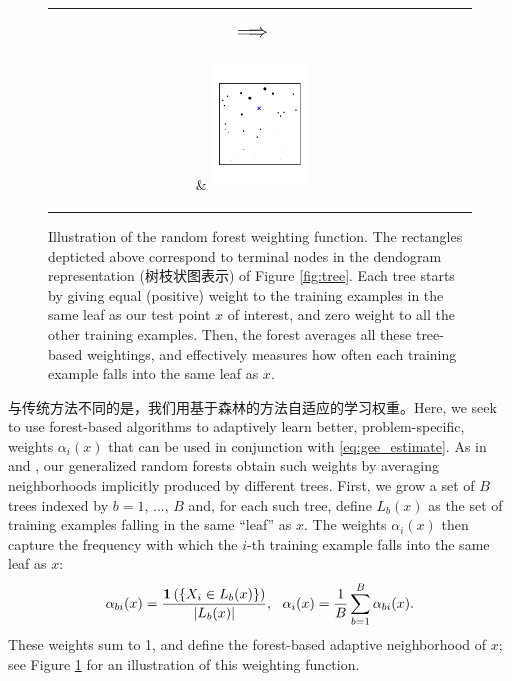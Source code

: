 \documentclass[aos]{imsart}
\theoremstyle{plain}
\theoremstyle{definition}
\theoremstyle{remark}
\begin{document}
\begin{CJK}{UTF8}{gbsn}
\begin{figure}
\begin{center}
\begin{tabular}{cc}
\parbox[b][0.25\textwidth][c]{0.12\textwidth}{$$\mathlarger{\mathlarger{\Longrightarrow}}$$} &
\includegraphics[width = 0.25\textwidth, trim=15mm 40mm 20mm 40mm, clip = TRUE]{tree_match_ensemble.pdf}
\end{tabular}
\end{center}
\caption{Illustration of the random forest weighting function. The rectangles depticted above correspond
to terminal nodes in the dendogram representation (树枝状图表示) of Figure \ref{fig:tree}. Each tree starts by giving equal
(positive) weight to the training examples in the same leaf as our test point $x$ of interest, and zero
weight to all the other training examples. Then, the forest averages all these tree-based weightings,
and effectively measures how often each training example falls into the same leaf as $x$.}
\label{fig:weighting}
\vspace{-1.5\baselineskip}
\end{figure}

与传统方法不同的是，我们用基于森林的方法自适应的学习权重。Here, we seek to use forest-based algorithms to adaptively learn better, problem-specific,
weights $\alpha_i(x)$ that can be used in conjunction with \eqref{eq:gee_estimate}.
As in \citet{hothorn2004bagging} and \citet{meinshausen2006quantile}, our generalized random forests obtain such weights
by averaging neighborhoods implicitly produced by different trees. First, we grow a set of
$B$ trees indexed by $b = 1, \, ..., \, B$ and, for each such tree, define $L_b(x)$
as the set of training examples falling in the same ``leaf'' as $x$. The weights $\alpha_i(x)$ then
capture the frequency with which the $i$-th training example falls into the same leaf as $x$:
\begin{equation}
\label{eq:forest_weights}
\alpha_{bi}(x) = \frac{\1\p{\cb{X_i \in L_b(x)}}}{\abs{L_b(x)}}, \ \ \alpha_i(x) = \frac{1}{B} \sum_{b = 1}^B \alpha_{bi}(x).
\end{equation}
These weights sum to 1, and define the forest-based adaptive neighborhood of $x$; see Figure \ref{fig:weighting} for an illustration of this weighting function.


\end{CJK}
\end{document}
